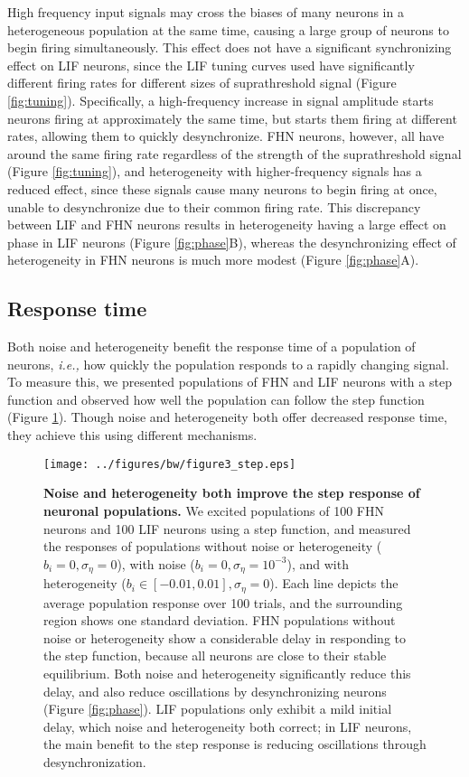 \documentclass[12pt]{article}
\newcommand{\ie}{\emph{i.e., }}
\newcommand{\fig}[1]{Figure \ref{fig:#1}}
\newcommand{\figlabel}[1]{\label{fig:#1}}
\begin{document}
High frequency input signals may cross the biases of many neurons in a heterogeneous population at the same time, causing a large group of neurons to begin firing simultaneously. This effect does not have a significant synchronizing effect on LIF neurons, since the LIF tuning curves used have significantly different firing rates for different sizes of suprathreshold signal (\fig{tuning}). Specifically, a high-frequency increase in signal amplitude starts neurons firing at approximately the same time, but starts them firing at different rates, allowing them to quickly desynchronize. FHN neurons, however, all have around the same firing rate regardless of the strength of the suprathreshold signal (\fig{tuning}), and heterogeneity with higher-frequency signals has a reduced effect, since these signals cause many neurons to begin firing at once, unable to desynchronize due to their common firing rate. This discrepancy between LIF and FHN neurons results in heterogeneity having a large effect on phase in LIF neurons (\fig{phase}B), whereas the desynchronizing effect of heterogeneity in FHN neurons is much more modest (\fig{phase}A).

\subsection{Response time}

Both noise and heterogeneity benefit the response time of a population of neurons, \ie how quickly the population responds to a rapidly changing signal. To measure this, we presented populations of FHN and LIF neurons with a step function and observed how well the population can follow the step function (\fig{step}). Though noise and heterogeneity both offer decreased response time, they achieve this using different mechanisms.

\begin{figure}
  \ifx\hidefigures\undefined
    \centering
    \texttt{[image: ../figures/bw/figure3\_step.eps]}
  \fi
  \caption{
    \textbf{Noise and heterogeneity both improve the step response of neuronal populations.} We excited populations of 100 FHN neurons and 100 LIF neurons using a step function, and measured the responses of populations without noise or heterogeneity ($b_i = 0, \sigma_\eta = 0$), with noise ($b_i = 0, \sigma_\eta = 10^{-3}$), and with heterogeneity ($b_i \in [-0.01,0.01], \sigma_\eta = 0$). Each line depicts the average population response over 100 trials, and the surrounding region shows one standard deviation. FHN populations without noise or heterogeneity show a considerable delay in responding to the step function, because all neurons are close to their stable equilibrium. Both noise and heterogeneity significantly reduce this delay, and also reduce oscillations by desynchronizing neurons (\fig{phase}). LIF populations only exhibit a mild initial delay, which noise and heterogeneity both correct; in LIF neurons, the main benefit to the step response is reducing oscillations through desynchronization.
  }
  \figlabel{step}
\end{figure}
\end{document}

